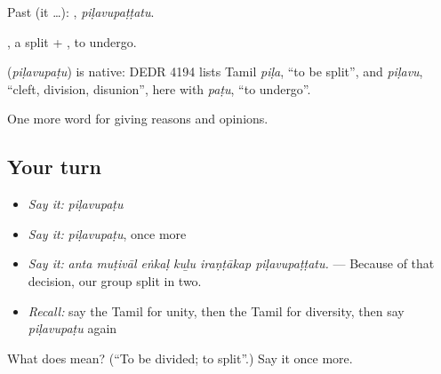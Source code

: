 Past (it …): , \emph{piḷavupaṭṭatu}.

, a split + , to undergo.

\begin{cousinweb}
\textbf{} (\emph{piḷavupaṭu}) is native: DEDR 4194 lists Tamil \emph{piḷa}, \textquotedblleft{}to be split\textquotedblright{}, and \emph{piḷavu}, \textquotedblleft{}cleft, division, disunion\textquotedblright{}, here with \emph{paṭu}, \textquotedblleft{}to undergo\textquotedblright{}.
\end{cousinweb}

\begin{grammarlens}[title={What you've built}]
One more word for giving reasons and opinions.
\end{grammarlens}

\subsection*{Your turn}
\begin{itemize}
\raggedright
  \item \emph{Say it:} \emph{piḷavupaṭu}
  \item \emph{Say it:} \emph{piḷavupaṭu}, once more
  \item \emph{Say it:} \emph{anta muṭivāl eṅkaḷ kuḻu iraṇṭākap piḷavupaṭṭatu.} — Because of that decision, our group split in two.
  \item \emph{Recall:} say the Tamil for unity, then the Tamil for diversity, then say \emph{piḷavupaṭu} again
\end{itemize}

\begin{tcolorbox}[breakable,colback=teal!4,colframe=teal!35!black,title={Before you move on}]
What does  mean? (\textquotedblleft{}To be divided; to split\textquotedblright{}.) Say it once more.
\end{tcolorbox}

